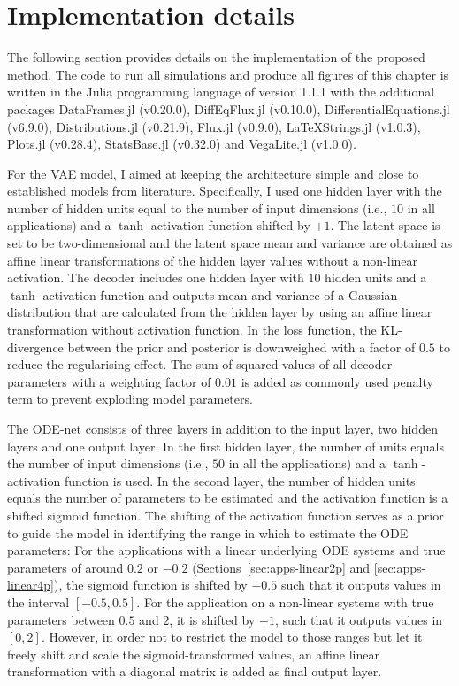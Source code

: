 \section{Implementation details}\label{sec:apps-implementation}

The following section provides details on the implementation of the proposed method. 
The code to run all simulations and produce all figures of this chapter is written in the Julia programming language of version 1.1.1 with the additional packages DataFrames.jl (v0.20.0), DiffEqFlux.jl (v0.10.0), DifferentialEquations.jl (v6.9.0), Distributions.jl (v0.21.9), Flux.jl (v0.9.0), LaTeXStrings.jl (v1.0.3), Plots.jl (v0.28.4), StatsBase.jl (v0.32.0) and VegaLite.jl (v1.0.0). 

For the VAE model, I aimed at keeping the architecture simple and close to established models from literature. Specifically, I used one hidden layer with the number of hidden units equal to the number of input dimensions (i.e., $10$ in all applications) and a $\tanh$-activation function shifted by $+1$. 
The latent space is set to be two-dimensional and the latent space mean and variance are obtained as affine linear transformations of the hidden layer values without a non-linear activation. The decoder includes one hidden layer with $10$ hidden units and a $\tanh$-activation function and outputs mean and variance of a Gaussian distribution that are calculated from the hidden layer by using an affine linear transformation without activation function. 
In the loss function, the KL-divergence between the prior and posterior is downweighed with a factor of $0.5$ to reduce the regularising effect. The sum of squared values of all decoder parameters with a weighting factor of $0.01$ is added as commonly used penalty term to prevent exploding model parameters. 

The ODE-net consists of three layers in addition to the input layer, two hidden layers and one output layer. In the first hidden layer, the number of units equals the number of input dimensions (i.e., $50$ in all the applications) and a $\tanh$-activation function is used. In the second layer, the number of hidden units equals the number of parameters to be estimated and the activation function is a shifted sigmoid function. The shifting of the activation function serves as a prior to guide the model in identifying the range in which to estimate the ODE parameters: For the applications with a linear underlying ODE systems and true parameters of around $0.2$ or $-0.2$ (Sections~\ref{sec:apps-linear2p} and \ref{sec:apps-linear4p}), the sigmoid function is shifted by $-0.5$ such that it outputs values in the interval $[-0.5,0.5]$. For the application on a non-linear systems with true parameters between $0.5$ and $2$, it is shifted by $+1$, such that it outputs values in $[0,2]$. However, in order not to restrict the model to those ranges but let it freely shift and scale the sigmoid-transformed values, an affine linear transformation with a diagonal matrix is added as final output layer. 

